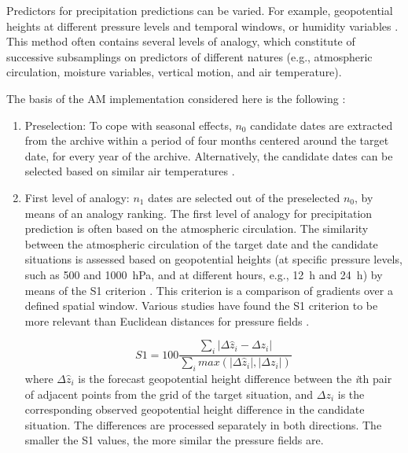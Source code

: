 \documentclass{ametsoc}
\begin{document}
Predictors for precipitation predictions can be varied. For example, geopotential heights at different pressure levels and temporal windows, or humidity variables \citep[see][for a more detailed list of predictors]{BenDaoud2016}. This method often contains several levels of analogy, which constitute of successive subsamplings on predictors of different natures (e.g., atmospheric circulation, moisture variables, vertical motion, and air temperature). 

The basis of the AM implementation considered here is the following \citep[the same approach as][]{Guilbaud1997, Bontron2005, Marty2012, Horton2012, Radanovics2013, Chardon2014, Dayon2015, BenDaoud2016}:

\begin{enumerate}
	\item Preselection: To cope with seasonal effects, $n_{0}$ candidate dates are extracted from the archive within a period of four months centered around the target date, for every year of the archive. Alternatively, the candidate dates can be selected based on similar air temperatures \citep[see][]{BenDaoud2016}.
	
	\item First level of analogy: $n_{1}$ dates are selected out of the preselected $n_{0}$, by means of an analogy ranking. The first level of analogy for precipitation prediction is often based on the atmospheric circulation. The similarity between the atmospheric circulation of the target date and the candidate situations is assessed based on geopotential heights (at specific pressure levels, such as 500 and 1000~hPa, and at different hours, e.g., 12~h and 24~h) by means of the S1 criterion \citep[Eq. (\ref{eq:S1}), ][]{Teweles1954, Drosdowsky2003}. This criterion is a comparison of gradients over a defined spatial window. Various studies have found the S1 criterion to be more relevant than Euclidean distances for pressure fields \citep{Wilson1980, Woodcock1980, Guilbaud1998, Bontron2004}.
	
	\begin{equation}
	\label{eq:S1}
	S1=100 \frac {\displaystyle \sum_{i} \vert \Delta\hat{z}_{i} - \Delta z_{i} \vert}
	{\displaystyle \sum_{i} max( \vert \Delta\hat{z}_{i} \vert , \vert \Delta z_{i} \vert ) }
	\end{equation}
	where $\Delta \hat{z}_{i}$ is the forecast geopotential height difference between the \textit{i}th pair of adjacent points from the grid of the target situation, and $\Delta z_{i}$ is the corresponding observed geopotential height difference in the candidate situation. The differences are processed separately in both directions. The smaller the S1 values, the more similar the pressure fields are.
	

\end{enumerate}
\end{document}
